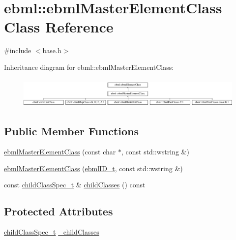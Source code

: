 \hypertarget{classebml_1_1ebmlMasterElementClass}{}\section{ebml\+:\+:ebml\+Master\+Element\+Class Class Reference}
\label{classebml_1_1ebmlMasterElementClass}


{\ttfamily \#include $<$base.\+h$>$}

Inheritance diagram for ebml\+:\+:ebml\+Master\+Element\+Class\+:\begin{figure}[H]
\begin{center}
\leavevmode
\includegraphics[height=1.534247cm]{classebml_1_1ebmlMasterElementClass}
\end{center}
\end{figure}
\subsection*{Public Member Functions}
\begin{DoxyCompactItemize}
\item 
\mbox{\hyperlink{classebml_1_1ebmlMasterElementClass_a46fb45335e35139c7f694ce9bc247d35}{ebml\+Master\+Element\+Class}} (const char $\ast$, const std\+::wstring \&)
\item 
\mbox{\hyperlink{classebml_1_1ebmlMasterElementClass_a1b455da9db4baed8bfeb2af3a1f7969b}{ebml\+Master\+Element\+Class}} (\mbox{\hyperlink{namespaceebml_a86c5f604ddf12a74aa9812e997a58691}{ebml\+I\+D\+\_\+t}}, const std\+::wstring \&)
\item 
const \mbox{\hyperlink{classebml_1_1childClassSpec__t}{child\+Class\+Spec\+\_\+t}} \& \mbox{\hyperlink{classebml_1_1ebmlMasterElementClass_ab3d49576f8ac2963fa5b996d692175ab}{child\+Classes}} () const
\end{DoxyCompactItemize}
\subsection*{Protected Attributes}
\begin{DoxyCompactItemize}
\item 
\mbox{\hyperlink{classebml_1_1childClassSpec__t}{child\+Class\+Spec\+\_\+t}} \mbox{\hyperlink{classebml_1_1ebmlMasterElementClass_a2281bbfd89c6c3201c1b778efd428cb7}{\+\_\+child\+Classes}}
\end{DoxyCompactItemize}
